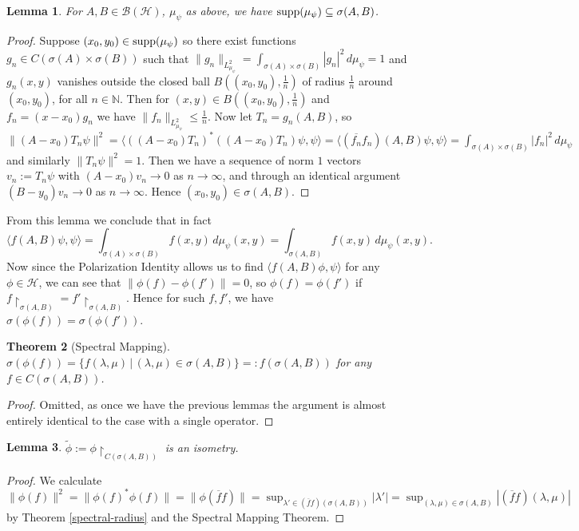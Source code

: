 \documentclass[12pt,oneside]{report}
\newtheorem{thm}{Theorem}[chapter]
\newtheorem{lem}[thm]{Lemma}
\begin{document}
 \begin{lem}
     For $A,B \in \mathscr{B}(\mathscr{H})$, $\mu_{\psi}$ as above, we have $\mathrm{supp}(\mu_{\psi}) \subseteq \sigma(A,B)$.
 \end{lem}
\begin{proof}
    Suppose $(x_{0},y_{0}) \in \mathrm{supp}(\mu_{\psi})$ so there exist functions $g_{n} \in C(\sigma(A) \times \sigma(B))$ such that $\|g_{n}\|_{L_{\mu_{\psi}}^{2}} = \int _{\sigma(A) \times \sigma(B)} |g_{n}|^{2} \, d\mu_{\psi} = 1$ and $g_{n}(x,y)$ vanishes outside the closed ball $B\left( (x_{0},y_{0}), \frac{1}{n} \right)$ of radius $\frac{1}{n}$ around $(x_{0},y_{0})$, for all $n \in \mathbb{N}$. Then for $(x,y) \in B\left( (x_{0},y_{0}), \frac{1}{n} \right)$ and $f_{n} = (x-x_{0})g_{n}$ we have $\|f_{n}\|_{L_{\mu_{\psi}}^{2}} \leq \frac{1}{n}$. Now let $T_{n} = g_{n}(A,B)$, so $\|(A - x_{0})T_{n}\psi\|^{2} = \langle ((A - x_{0})T_{n})^{*}((A - x_{0})T_{n})\psi, \psi \rangle = \langle (\overline{f_{n}}f_{n})(A,B)\psi,\psi \rangle = \int _{\sigma(A) \times \sigma(B)} |f_{n}|^{2} \, d\mu_{\psi}$ and similarly $\|T_{n}\psi\|^{2} = 1$. Then we have a sequence of norm $1$ vectors $v_{n} := T_{n}\psi$ with $(A - x_{0})v_{n} \to 0$ as $n \to \infty$, and through an identical argument $(B - y_{0})v_{n} \to 0$ as $n \to \infty$. Hence $(x_{0},y_{0}) \in \sigma(A,B)$.
\end{proof}

From this lemma we conclude that in fact
$$\langle f(A,B)\psi, \psi \rangle = \int _{\sigma(A) \times \sigma(B)} f(x,y) \, d\mu_{\psi}(x,y) = \int _{\sigma(A,B)} f(x,y) \, d\mu_{\psi}(x,y).$$
Now since the Polarization Identity allows us to find $\langle f(A,B)\phi, \psi \rangle$ for any $\phi \in \mathscr{H}$, we can see that $\|\phi(f) - \phi(f')\| = 0$, so $\phi(f) = \phi(f')$ if $f\restriction_{\sigma(A,B)} = f'\restriction_{\sigma(A,B)}$. Hence for such $f,f'$, we have $\sigma(\phi(f)) = \sigma(\phi(f'))$.

\begin{thm}[Spectral Mapping]\label{commuting-spectral-mapping}
    $\sigma(\phi(f)) = \{ f(\lambda,\mu)  \, | \, (\lambda,\mu) \in \sigma(A,B) \} =: f(\sigma(A,B))$ for any $f \in C(\sigma(A,B))$.
\end{thm}
\begin{proof}
    Omitted, as once we have the previous lemmas the argument is almost entirely identical to the case with a single operator.
\end{proof}

\begin{lem}
    $\tilde{\phi} := \phi \restriction_{C(\sigma(A,B))}$ is an isometry.
\end{lem}
\begin{proof}
    We calculate $\|\phi(f)\|^{2} = \|\phi(f)^{*}\phi(f)\| = \|\phi(\overline{f}f)\| = \sup_{\lambda' \in (\overline{f}f)(\sigma(A,B))} |\lambda'| = \sup_{(\lambda,\mu) \in \sigma(A,B)} |(\overline{f}f)(\lambda,\mu)|$ by Theorem \ref{spectral-radius} and the Spectral Mapping Theorem.
\end{proof}
\end{document}
